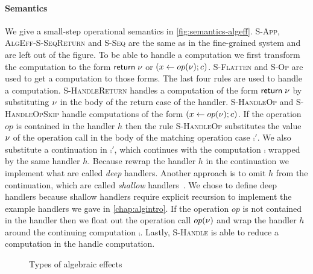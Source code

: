 {\paragraph{Semantics}
We give a small-step operational semantics in \cref{fig:semantics-algeff}.
\textsc{S-App}, \textsc{AlgEff-S-SeqReturn} and \textsc{S-Seq} are the same as in the fine-grained system and are left out of the figure.
To be able to handle a computation we first transform the computation to the form $\mathsf{return} \; \nu$ or $(x \leftarrow op(\nu) ; c)$.
\textsc{S-Flatten} and \textsc{S-Op} are used to get a computation to those forms.
The last four rules are used to handle a computation.
\textsc{S-HandleReturn} handles a computation of the form $\mathsf{return} \; \nu$ by substituting $\nu$ in the body of the return case of the handler.
\textsc{S-HandleOp} and \textsc{S-HandleOpSkip} handle computations of the form $(x \leftarrow op(\nu) ; c)$.
If the operation $op$ is contained in the handler $h$ then the rule \textsc{S-HandleOp} substitutes the value $\nu$ of the operation call in the body of the matching operation case $\comp'$.
We also substitute a continuation in $\comp'$, which continues with the computation $\comp$ wrapped by the same handler $h$.
Because rewrap the handler $h$ in the continuation we implement what are called \emph{deep} handlers.
Another approach is to omit $h$ from the continuation, which are called \emph{shallow} handlers~\autocite{shallowhandlers}.
We chose to define deep handlers because shallow handlers require explicit recursion to implement the example handlers we gave in \cref{chap:algintro}. 
If the operation $op$ is not contained in the handler then we float out the operation call $op(\nu)$ and wrap the handler $h$ around the continuing computation $\comp$.
Lastly, \textsc{S-Handle} is able to reduce a computation in the handle computation.

\begin{figure}
\caption{Types of algebraic effects}
\centering
{}
\end{figure}

}
